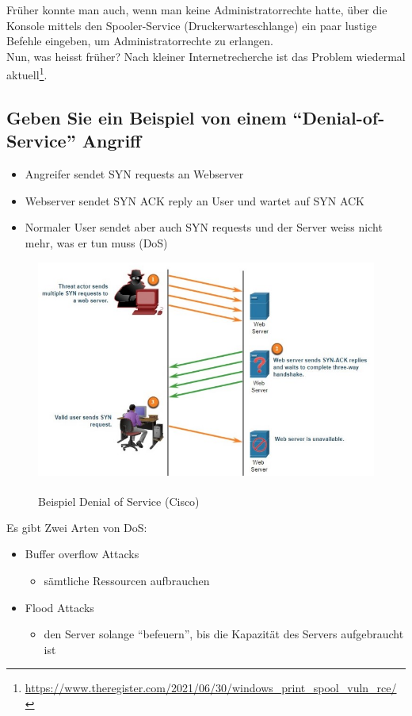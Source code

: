 Früher konnte man auch, wenn man keine Administratorrechte hatte, über die Konsole mittels den Spooler-Service (Druckerwarteschlange) ein paar lustige Befehle eingeben, um Administratorrechte zu erlangen.\\
Nun, was heisst früher? Nach kleiner Internetrecherche ist das Problem wiedermal aktuell\footnote{\url{https://www.theregister.com/2021/06/30/windows_print_spool_vuln_rce/}}.

\pagebreak
\subsection*{Geben Sie ein Beispiel von einem "`Denial-of-Service"' Angriff}
\begin{itemize}
    \item Angreifer sendet SYN requests an Webserver
    \item Webserver sendet SYN ACK reply an User und wartet auf SYN ACK
    \item Normaler User sendet aber auch SYN requests und der Server weiss nicht mehr, was er tun muss (DoS)
\end{itemize}

\begin{figure}[H]
    \begin{center}
        \label{pic:DoS}
        \includegraphics[width=\textwidth]{images/DoS.jpg}
        \caption{Beispiel Denial of Service (\textsuperscript{\textcopyright}Cisco)}
    \end{center}
\end{figure}

Es gibt Zwei Arten von DoS:
\begin{itemize}
    \item Buffer overflow Attacks
    \begin{itemize}
        \item sämtliche Ressourcen aufbrauchen
    \end{itemize}
    \item Flood Attacks
    \begin{itemize}
        \item den Server solange "`befeuern"', bis die Kapazität des Servers aufgebraucht ist
    \end{itemize}
\end{itemize}

